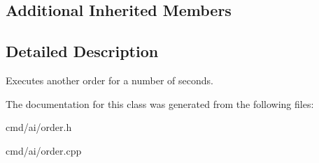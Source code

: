 \subsection*{Additional Inherited Members}


\subsection{Detailed Description}
Executes another order for a number of seconds. 

The documentation for this class was generated from the following files\+:\begin{DoxyCompactItemize}
\item 
cmd/ai/order.\+h\item 
cmd/ai/order.\+cpp\end{DoxyCompactItemize}
